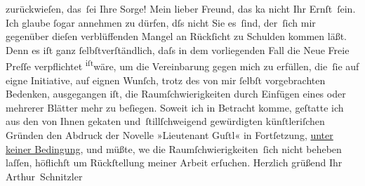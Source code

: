                zurückwieſen, das ſei Ihre Sorge! Mein lieber Freund, das ka{\geminationn} nicht Ihr Ernſt ſein.
               Ich glaube{ }ſogar annehmen zu dürfen, dſs nicht Sie es ſind, der ſich mir gegenüber
               dieſen verblüffenden Mangel an Rückſicht zu Schulden kommen läßt. Denn es iſt ganz{ }ſelbſtverſtändlich, daſs in dem vorliegenden Fall die Neue Freie Preſſe verpflichtet \substVorne{}\textsuperscript{iſt}\substDazwischen{}wäre\substHinten{}, um die Vereinbarung gegen mich zu erfüllen, die ſie auf eigne Initiative,
               auf eignen Wunſch, trotz des von mir {\pb}ſelbſt vorgebrachten
               Bedenken, ausgegangen iſt, die Raumſchwierigkeiten durch Einfügen eines oder mehrerer
               Blätter mehr zu beſiegen. Soweit ich in Betracht komme, geſtatte ich aus den von
               Ihnen geka{\geminationn}ten und ſtillſchweigend gewürdigten künſtleriſchen Gründen den Abdruck der
               Novelle »Lieutenant Guſtl« in Fortſetzung, \uline{unter keiner Bedingung}, und müßte, we{\geminationn} die
               Raumſchwierigkeiten ſich nicht beheben laſſen, höflichſt um Rückſtellung meiner
               Arbeit erſuchen.\pend
           \pstart Herzlich grüßend Ihr \spacefill\mbox{Arthur Schnitzler}\pend{}\endnumbering{}
\begin{anhang}
\end{anhang}\newcommand{\dateiname}{L03938}\newcommand{\titel}{Arthur Schnitzler an Theodor Herzl, 22. 12. 1900}\newcommand{\editorInnen}{Herausgegeben von Jahnke, SelmaMüller, Martin Anton}
